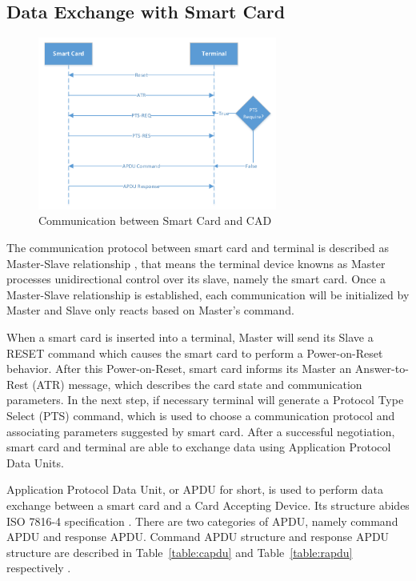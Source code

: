 \subsection{Data Exchange with Smart Card}

\begin{figure}[!htbp]
	\centering
	\includegraphics[width=0.7\textwidth]{master-slave-relationship}
		\caption{Communication between Smart Card and CAD \cite{handbuch}}
	\label{fig:master-slave-relationship}
\end{figure}
The communication protocol between smart card and terminal is described as Master-Slave relationship \cite{handbuch}, that means the terminal device knowns as Master processes unidirectional control over its slave, namely the smart card. Once a Master-Slave relationship is established, each communication will be initialized by Master and Slave only reacts based on Master's command. 

When a smart card is inserted into a terminal, Master will send its Slave a RESET command which causes the smart card to perform a Power-on-Reset behavior. After this Power-on-Reset, smart card informs its Master an Answer-to-Rest (ATR) message, which describes the card state and communication parameters. In the next step, if necessary terminal will generate a Protocol Type Select (PTS) command, which is used to choose a communication protocol and associating parameters suggested by smart card. After a successful negotiation, smart card and terminal are able to exchange data using Application Protocol Data Units.
  
Application Protocol Data Unit, or APDU for short, is used  to perform data exchange between a smart card and a Card Accepting Device.  Its structure abides ISO 7816-4 specification \cite{chen}. There are two categories of APDU, namely command APDU and response APDU. Command APDU structure and response APDU structure are described in Table~\ref{table:capdu} and Table~\ref{table:rapdu} respectively \cite{handbuch}. 

